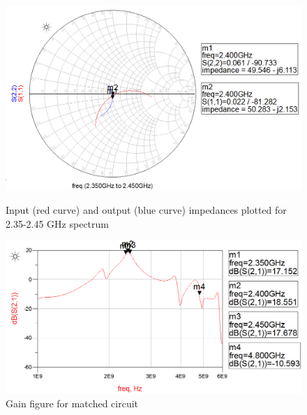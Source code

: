  \begin{figure}[h]
	  \begin{minipage}[b]{0.45\textwidth}
	  \centering
	  \includegraphics[width=\linewidth]{img/Matching_smith_chart}
  	  \caption{Input (red curve) and output (blue curve) impedances plotted for 2.35-2.45 GHz spectrum}
 	  \label{fig:MatchSmith}
  \end{minipage}%
  \begin{minipage}{.1\textwidth}
	  \hspace{\linewidth}
  \end{minipage}%
  \begin{minipage}[b]{0.45\textwidth}
	  \centering
	  \includegraphics[width=\linewidth]{img/Small_signal_gain_matched}
  	  \caption{Gain figure for matched circuit}
  	  \label{fig:MatchGain}
  \end{minipage}
  \end{figure}
